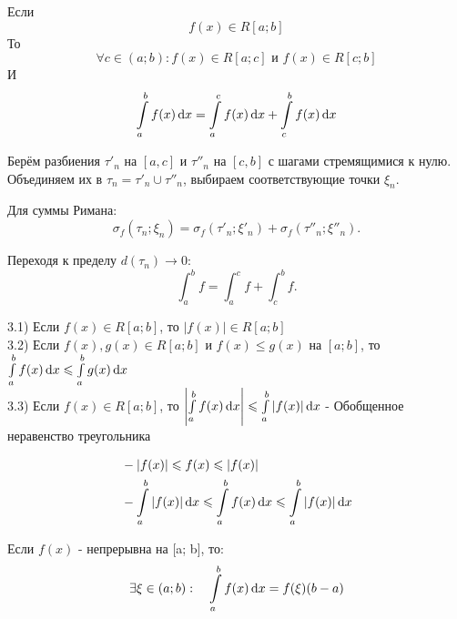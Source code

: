\begin{theorem}[Аддитивность]
    Если
    \[
        f(x) \in R[a; b]
    \]
    То
    \[
        \forall c \in (a; b): f(x) \in R[a; c] \text{ и } f(x) \in R[c; b]
    \]
    И
    \[
        \int\limits_{a}^{b}{f(x)\mathop{}\!\mathrm{d} x} = \int\limits_{a}^{c}{f(x)\mathop{}\!\mathrm{d} x} + \int\limits_{c}^{b}{f(x)\mathop{}\!\mathrm{d} x}
    \]
\end{theorem}
\begin{Proof}
    Берём разбиения $\tau'_n$ на $[a,c]$ и $\tau''_n$ на $[c,b]$ с шагами стремящимися к нулю.  
Объединяем их в $\tau_n = \tau'_n \cup \tau''_n$, выбираем соответствующие точки $\xi_n$.  

Для суммы Римана:
\[
\sigma_f(\tau_n;\xi_n) = \sigma_f(\tau'_n;\xi'_n) + \sigma_f(\tau''_n;\xi''_n).
\]

Переходя к пределу $d(\tau_n)\to 0$:
\[
\int_a^b f = \int_a^c f + \int_c^b f.
\]
\end{Proof}

\begin{theorem}[Неравенства]
    3.1) Если $f(x) \in R[a; b]$, то $|f(x)| \in R[a; b]$\\
    3.2) Если $f(x), g(x) \in R[a; b]$ и $f(x) \leq g(x) \text{ на } [a; b]$, то $\int\limits_{a}^{b}{f(x)\mathop{}\!\mathrm{d} x} \leqslant \int\limits_{a}^{b}{g(x)\mathop{}\!\mathrm{d} x}$\\
    3.3) Если $f(x) \in R[a; b]$, то $\left|\int\limits_{a}^{b}{f(x)\mathop{}\!\mathrm{d} x}\right| \leqslant \int\limits_{a}^{b}{|f(x)|\mathop{}\!\mathrm{d} x}$ - Обобщенное неравенство треугольника\\
\end{theorem}

\begin{Proof}
    \[
    \begin{aligned}
        &-|f(x)| \leqslant f(x) \leqslant |f(x)|\\
        &-\int\limits_{a}^{b}{|f(x)|\mathop{}\!\mathrm{d} x} \leqslant \int\limits_{a}^{b}{f(x)\mathop{}\!\mathrm{d} x} \leqslant \int\limits_{a}^{b}{|f(x)|\mathop{}\!\mathrm{d} x}\\
    \end{aligned}
    \]
\end{Proof}

\begin{theorem}
    Если $f(x)$ - непрерывна на [a; b], то:\\
    \[
        \exists\xi\in(a; b):\quad \int\limits_{a}^{b}{f(x)\mathop{}\!\mathrm{d} x} = f(\xi)(b - a)
    \]
\end{theorem}

